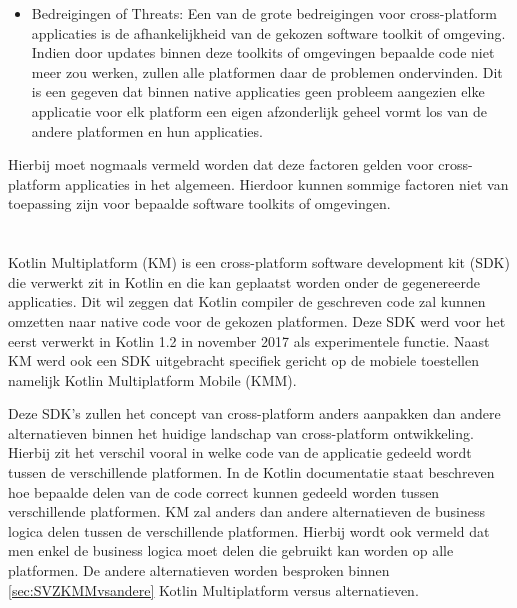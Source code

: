\begin{itemize}
    \item Bedreigingen of Threats:
    Een van de grote bedreigingen voor cross-platform applicaties is de afhankelijkheid van de gekozen software toolkit of omgeving. Indien door updates binnen deze toolkits of omgevingen bepaalde code niet meer zou werken, zullen alle platformen daar de problemen ondervinden. Dit is een gegeven dat binnen native applicaties geen probleem aangezien elke applicatie voor elk platform een eigen afzonderlijk geheel vormt los van de andere platformen en hun applicaties. 
\end{itemize}

Hierbij moet nogmaals vermeld worden dat deze factoren gelden voor cross-platform applicaties in het algemeen. Hierdoor kunnen sommige factoren niet van toepassing zijn voor bepaalde software toolkits of omgevingen. 



\section{}
\label{sec:SVZKM}

Kotlin Multiplatform (KM) is een cross-platform software development kit (SDK) die verwerkt zit in Kotlin en die kan geplaatst worden onder de gegenereerde applicaties. Dit wil zeggen dat Kotlin compiler de geschreven code zal kunnen omzetten naar native code voor de gekozen platformen.\autocite{Evert2019} Deze SDK werd voor het eerst verwerkt in Kotlin 1.2 in november 2017 als experimentele functie.\autocite{Jemerov2017} Naast KM werd ook een SDK uitgebracht specifiek gericht op de mobiele toestellen namelijk Kotlin Multiplatform Mobile (KMM). 

Deze SDK's zullen het concept van cross-platform anders aanpakken dan andere alternatieven binnen het huidige landschap van cross-platform ontwikkeling. Hierbij zit het verschil vooral in welke code van de applicatie gedeeld wordt tussen de verschillende platformen. In de Kotlin documentatie staat beschreven hoe bepaalde delen van de code correct kunnen gedeeld worden tussen verschillende platformen. KM zal anders dan andere alternatieven de business logica delen tussen de verschillende platformen.\autocite{Kotlin2021} Hierbij wordt ook vermeld dat men enkel de business logica moet delen die gebruikt kan worden op alle platformen. De andere alternatieven worden besproken binnen \ref{sec:SVZKMMvsandere} Kotlin Multiplatform versus alternatieven.

